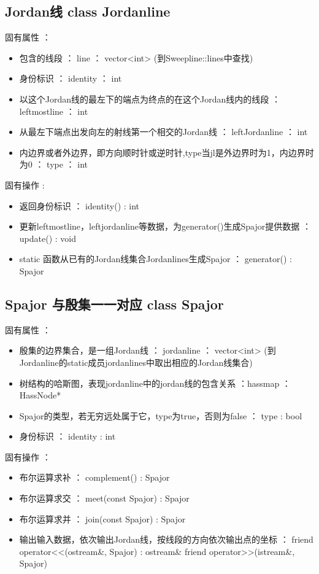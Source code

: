 \documentclass[a4paper]{book}
\numberwithin{equation}{chapter}
\theoremstyle{definition}
\begin{document}
\subsection{Jordan线 class Jordanline}
固有属性 ：
\begin{itemize}
	\item  包含的线段 ： line ： vector<int>  (到Sweepline::lines中查找)
	\item  身份标识 ： identity ： int 
	\item  以这个Jordan线的最左下的端点为终点的在这个Jordan线内的线段 ： leftmostline ： int
	\item  从最左下端点出发向左的射线第一个相交的Jordan线 ： leftJordanline ： int
	\item  内边界或者外边界，即方向顺时针或逆时针,type当jl是外边界时为1，内边界时为0 ： type ： int
\end{itemize}
固有操作 :
\begin{itemize}
	\item  返回身份标识 ： identity() : int
	\item  更新leftmostline，leftjordanline等数据，为generator()生成Spajor提供数据 ： update() : void
	\item  static 函数从已有的Jordan线集合Jordanlines生成Spajor ： generator() : Spajor 
\end{itemize}
\subsection{Spajor 与殷集一一对应 class Spajor}
固有属性 ：
\begin{itemize}
	\item  殷集的边界集合，是一组Jordan线 ： jordanline ： vector<int> (到Jordanline的static成员jordanlines中取出相应的Jordan线集合)
	\item  树结构的哈斯图，表现jordanline中的jordan线的包含关系 ：hassmap ： HassNode* 
	\item  Spajor的类型，若无穷远处属于它，type为true，否则为false ： type : bool
	\item  身份标识 ： identity : int
\end{itemize}
固有操作 ：
\begin{itemize}
	\item  布尔运算求补 ： complement() : Spajor
	\item  布尔运算求交 ： meet(const Spajor) : Spajor
	\item  布尔运算求并 ： join(const Spajor) : Spajor
	\item  输出输入数据，依次输出Jordan线，按线段的方向依次输出点的坐标 ： friend operator<<(ostream\&, Spajor) : ostream\&  friend operator>>(istream\&, Spajor)
\end{itemize}
\end{document}
